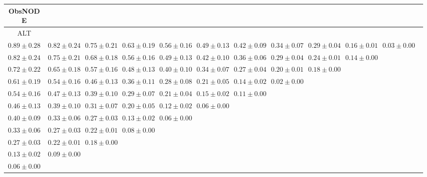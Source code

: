 \begin{table}[ht]
\centering
{\tiny
{
\begin{adjustbox}{width=\textwidth}

\begin{tabular}{cccccccccccc}
\hline
ObsNODE &  &  &  &  &  &  &  &  &  & \\
\hline
ALT &  &  &  &  &  &  &  &  &  & \\
\hline
$0.89 \pm 0.28$ & $0.82 \pm 0.24$ & $0.75 \pm 0.21$ & $0.63 \pm 0.19$ & $0.56 \pm 0.16$ & $0.49 \pm 0.13$ & $0.42 \pm 0.09$ & $0.34 \pm 0.07$ & $0.29 \pm 0.04$ & $0.16 \pm 0.01$ & $0.03 \pm 0.00$ &  \\
$0.82 \pm 0.24$ & $0.75 \pm 0.21$ & $0.68 \pm 0.18$ & $0.56 \pm 0.16$ & $0.49 \pm 0.13$ & $0.42 \pm 0.10$ & $0.36 \pm 0.06$ & $0.29 \pm 0.04$ & $0.24 \pm 0.01$ & $0.14 \pm 0.00$ &  &  \\
$0.72 \pm 0.22$ & $0.65 \pm 0.18$ & $0.57 \pm 0.16$ & $0.48 \pm 0.13$ & $0.40 \pm 0.10$ & $0.34 \pm 0.07$ & $0.27 \pm 0.04$ & $0.20 \pm 0.01$ & $0.18 \pm 0.00$ &  &  &  \\
$0.61 \pm 0.19$ & $0.54 \pm 0.16$ & $0.46 \pm 0.13$ & $0.36 \pm 0.11$ & $0.28 \pm 0.08$ & $0.21 \pm 0.05$ & $0.14 \pm 0.02$ & $0.02 \pm 0.00$ &  &  &  &  \\
$0.54 \pm 0.16$ & $0.47 \pm 0.13$ & $0.39 \pm 0.10$ & $0.29 \pm 0.07$ & $0.21 \pm 0.04$ & $0.15 \pm 0.02$ & $0.11 \pm 0.00$ &  &  &  &  &  \\
$0.46 \pm 0.13$ & $0.39 \pm 0.10$ & $0.31 \pm 0.07$ & $0.20 \pm 0.05$ & $0.12 \pm 0.02$ & $0.06 \pm 0.00$ &  &  &  &  &  &  \\
$0.40 \pm 0.09$ & $0.33 \pm 0.06$ & $0.27 \pm 0.03$ & $0.13 \pm 0.02$ & $0.06 \pm 0.00$ &  &  &  &  &  &  &  \\
$0.33 \pm 0.06$ & $0.27 \pm 0.03$ & $0.22 \pm 0.01$ & $0.08 \pm 0.00$ &  &  &  &  &  &  &  &  \\
$0.27 \pm 0.03$ & $0.22 \pm 0.01$ & $0.18 \pm 0.00$ &  &  &  &  &  &  &  &  &  \\
$0.13 \pm 0.02$ & $0.09 \pm 0.00$ &  &  &  &  &  &  &  &  &  &  \\
$0.06 \pm 0.00$ &  &  &  &  &  &  &  &  &  &  &  \\


\end{tabular}
\end{adjustbox}}}
\end{table}
